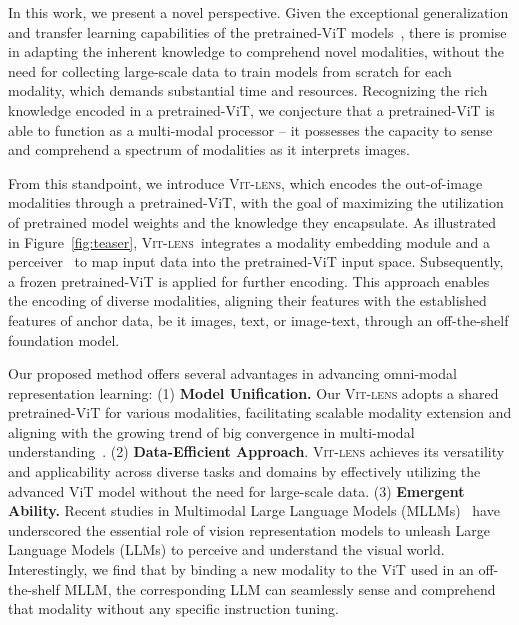 \documentclass{article}
\newcommand{\ptvit}{pretrained-ViT\xspace}
\newcommand{\vit}{ViT\xspace}
\newcommand{\methodname}{{\scshape Vit-lens}\xspace}
\begin{document}
In this work, we present a novel perspective. 
Given the exceptional generalization and transfer learning capabilities of the \ptvit models~\cite{openai_clip,fang2023eva,fang2023eva02,caron2021dino,oquab2023dinov2}, there is promise in adapting the inherent knowledge to comprehend novel modalities, without the need for collecting large-scale data to train models from scratch for each modality, which demands substantial time and resources. Recognizing the rich knowledge encoded in a \ptvit, we conjecture that a \ptvit is able to function as a multi-modal processor -- it possesses the capacity to sense and comprehend a spectrum of modalities as it interprets images. 


From this standpoint, 
we introduce \methodname, which encodes the out-of-image modalities through a \ptvit, with the goal of maximizing the utilization of pretrained model weights and the knowledge they encapsulate.
As illustrated in Figure~\ref{fig:teaser}, \methodname\ integrates a modality embedding module and a perceiver~\cite{jaegle2021perceiver} to map input data into the \ptvit input space. Subsequently, a frozen \ptvit is applied for further encoding. This approach enables the encoding of diverse modalities, aligning their features with the established features of anchor data, be it images, text, or image-text, through an off-the-shelf foundation model.


Our proposed method offers several advantages in advancing omni-modal representation learning:
(1) \textbf{Model Unification.} Our \methodname adopts a shared \ptvit for various modalities, facilitating scalable modality extension and aligning with the growing trend of big convergence in multi-modal understanding~\cite{wang2023beit3}.
(2) \textbf{Data-Efficient Approach}. \methodname achieves its versatility and applicability across diverse tasks and domains by effectively utilizing the advanced \vit model without the need for large-scale data.
(3) \textbf{Emergent Ability.} Recent studies in Multimodal Large Language Models (MLLMs)~\cite{blip2,alayrac2022flamingo,openai2023gpt4,zhu2022minigpt4,liu2023llava,dai2023instructblip} have underscored the essential role of vision representation models to unleash Large Language Models (LLMs) to perceive and understand the visual world. 
Interestingly, we find that by binding a new modality to the \vit used in an off-the-shelf MLLM, the corresponding LLM can seamlessly sense and comprehend that modality without any specific instruction tuning.
\end{document}
